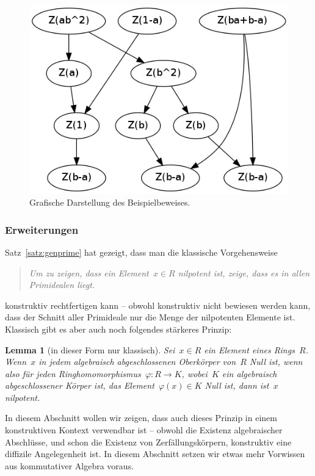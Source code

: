 \documentclass[a4paper,ngerman,12pt]{scrartcl}
\theoremstyle{definition}
\theoremstyle{plain}
\newtheorem{lemma}[defn]{Lemma}
\theoremstyle{remark}
\renewcommand{\_}{\mathpunct{.}\,}
\newcommand{\?}{\,{:}\,}
\begin{document}
\begin{figure}
  \centering
  \includegraphics[scale=0.5]{dynamical-proof}
  \caption{\label{dynamical}Grafische Darstellung des Beispielbeweises.}
\end{figure}


\subsubsection*{Erweiterungen}

Satz~\ref{satz:genprime} hat gezeigt, dass man die klassische Vorgehensweise
\begin{quote}
\emph{Um zu zeigen, dass ein Element~$x \in R$ nilpotent ist, zeige, dass es in allen
Primidealen liegt.}\end{quote}
konstruktiv rechtfertigen kann -- obwohl konstruktiv nicht bewiesen werden
kann, dass der Schnitt aller Primideale nur die Menge der nilpotenten Elemente
ist. Klassisch gibt es aber auch noch folgendes stärkeres Prinzip:
\begin{lemma}[in dieser Form nur klassisch]\label{lemma:nullinabschl}%
Sei~$x \in R$ ein Element eines Rings~$R$. Wenn~$x$ in jedem algebraisch
abgeschlossenen Oberkörper von~$R$ Null ist, wenn also für jeden
Ringhomomorphismus~$\varphi : R \to K$, wobei~$K$ ein algebraisch
abgeschlossener Körper ist, das Element~$\varphi(x) \in K$ Null ist, dann
ist~$x$ nilpotent.\end{lemma}
In diesem Abschnitt wollen wir zeigen, dass auch dieses Prinzip
in einem konstruktiven Kontext verwendbar ist -- obwohl die Existenz
algebraischer Abschlüsse, und schon die Existenz von Zerfällungskörpern,
konstruktiv eine diffizile Angelegenheit ist. In diesem Abschnitt setzen wir
etwas mehr Vorwissen aus kommutativer Algebra voraus.
\end{document}
